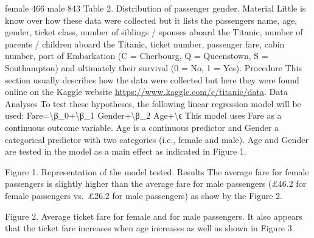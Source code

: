 \documentclass[
]{article}
\begin{document}
female 466 male 843 Table 2. Distribution of passenger gender. Material
Little is know over how these data were collected but it lists the
passengers name, age, gender, ticket class, number of siblings / spouses
aboard the Titanic, number of parents / children aboard the Titanic,
ticket number, passenger fare, cabin number, port of Embarkation (C =
Cherbourg, Q = Queenstown, S = Southampton) and ultimately their
survival (0 = No, 1 = Yes). Procedure This section usually describes how
the data were collected but here they were found online on the Kaggle
website \url{https://www.kaggle.com/c/titanic/data}. Data Analyses To
test these hypotheses, the following linear regression model will be
used: Fare=\textbackslash β\_0+\textbackslash β\_1
Gender+\textbackslash β\_2 Age+\textbackslash ϵ This model uses Fare as
a continuous outcome variable. Age is a continuous predictor and Gender
a categorical predictor with two categories (i.e., female and male). Age
and Gender are tested in the model as a main effect as indicated in
Figure 1.

Figure 1. Representation of the model tested. Results The average fare
for female passengers is slightly higher than the average fare for male
passengers (£46.2 for female passengers vs.~£26.2 for male passengers)
as show by the Figure 2.

Figure 2. Average ticket fare for female and for male passengers. It
also appears that the ticket fare increases when age increases as well
as shown in Figure 3.
\end{document}
